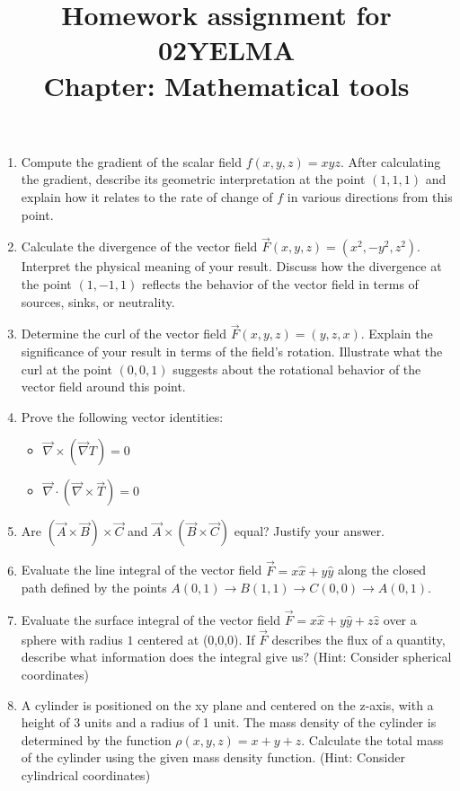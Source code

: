 \documentclass[12pt]{article}
\title{Homework assignment for 02YELMA \\ Chapter: Mathematical tools}
\begin{document}
\date{}
\maketitle
\vspace{-0.8in}
\begin{enumerate}
    \item  Compute the gradient of the scalar field \(f(x, y, z) = xyz\). After calculating the gradient, describe its geometric interpretation at the point \((1, 1, 1)\) and explain how it relates to the rate of change of \(f\) in various directions from this point.
    
    \item Calculate the divergence of the vector field \(\vec{F}(x, y, z) = (x^2, -y^2, z^2)\). Interpret the physical meaning of your result. Discuss how the divergence at the point \((1, -1, 1)\) reflects the behavior of the vector field in terms of sources, sinks, or neutrality.
    
    \item  Determine the curl of the vector field \(\vec{F}(x, y, z) = (y, z, x)\). Explain the significance of your result in terms of the field's rotation. Illustrate what the curl at the point \((0, 0, 1)\) suggests about the rotational behavior of the vector field around this point.
    \item  Prove the following vector identities:
    \begin{itemize}
        \item $\vec{\nabla}\times(\vec{\nabla}T)=0$
        \item $\vec{\nabla}\cdot(\vec{\nabla}\times\vec{T})=0$
    \end{itemize}
    \item Are $(\vec{A}\times\vec{B})\times\vec{C}$ and $\vec{A}\times(\vec{B}\times\vec{C})$ equal? Justify your answer.
   \item  Evaluate the line integral of the vector field \( \vec{F} = x\hat{x} + y\hat{y} \) along the closed path defined by the points $A(0,1)\rightarrow B(1,1)\rightarrow C(0,0)\rightarrow A(0,1)$.
    
    \item Evaluate the surface integral of the vector field \( \vec{F} = x\hat{x} + y\hat{y} + z\hat{z} \) over a sphere with radius $1$ centered at (0,0,0). If $\vec{F}$ describes the flux of a quantity, describe what information does the integral give us? (Hint: Consider spherical coordinates)
    
    \item  A cylinder is positioned on the xy plane and centered on the z-axis, with a height of 3 units and a radius of 1 unit. The mass density of the cylinder is determined by the function \( \rho(x,y,z) = x + y +z \). Calculate the total mass of the cylinder using the given mass density function. (Hint: Consider cylindrical coordinates)


\end{enumerate}
\end{document}
